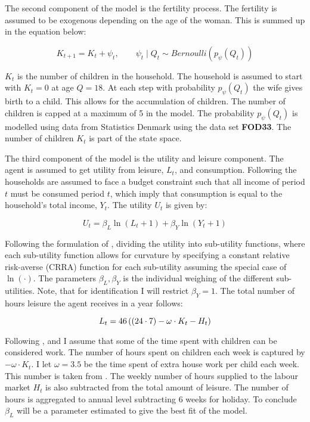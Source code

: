 The second component of the model is the fertility process. The fertility is assumed to be exogenous depending on the age of the woman. This is summed up in the equation below:

\begin{equation}
    K_{t+1} = K_t+ \psi_t, \qquad \psi_t \mid Q_t \sim Bernoulli (p_\psi(Q_t))
\end{equation}

$K_t$ is the number of children in the household. The household is assumed to start with $K_t = 0$ at age $Q=18$. At each step with probability $p_\psi(Q_t)$ the wife gives birth to a child. This allows for the accumulation of children. The number of children is capped at a maximum of 5 in the model. The probability $p_\psi(Q_t)$ is modelled using data from Statistics Denmark using the data set \textbf{FOD33}. The number of children $K_t$ is part of the state space. 

The third component of the model is the utility and leisure component. The agent is assumed to get utility from leisure, $L_t$, and consumption. Following \textcite{francesconi_joint_2002} the households are assumed to face a budget constraint such that all income of period $t$ must be consumed period $t$, which imply that consumption is equal to the household's total income, $Y_t$. The utility $U_t$ is given by:

\begin{equation}
    U_t = \beta_L \ln(L_t + 1) + \beta_Y \ln(Y_t + 1)
\end{equation}

Following the formulation of \textcite{adda_career_2011}, dividing the utility into sub-utility functions, where each sub-utility function allows for curvature by specifying a constant relative risk-averse (CRRA) function for each sub-utility assuming the special case of $\ln(\cdot)$. The parameters $\beta_L, \beta_Y$ is the individual weighing of the different sub-utilities. Note, that for identification I will restrict $\beta_Y= 1$. The total number of hours leisure the agent receives in a year follows: 

\begin{equation}
    L_t = 46 \left( \left( 24 \cdot 7 \right) - \omega \cdot K_t - H_t \right)
\end{equation}

Following \textcite{firestone_estimation_1988}, \textcite{thrane_men_2000} and \textcite{ekert-jaffe_time_2015} I assume that some of the time spent with children can be considered work. The number of hours spent on children each week is captured by $-\omega \cdot K_t$. I let $\omega=3.5$ be the time spent of extra house work per child each week. This number is taken from \textcite{ekert-jaffe_time_2015}. The weekly number of hours supplied to the labour market $H_t$ is also subtracted from the total amount of leisure. The number of hours is aggregated to annual level subtracting 6 weeks for holiday. To conclude $\beta_L$ will be a parameter estimated to give the best fit of the model.

